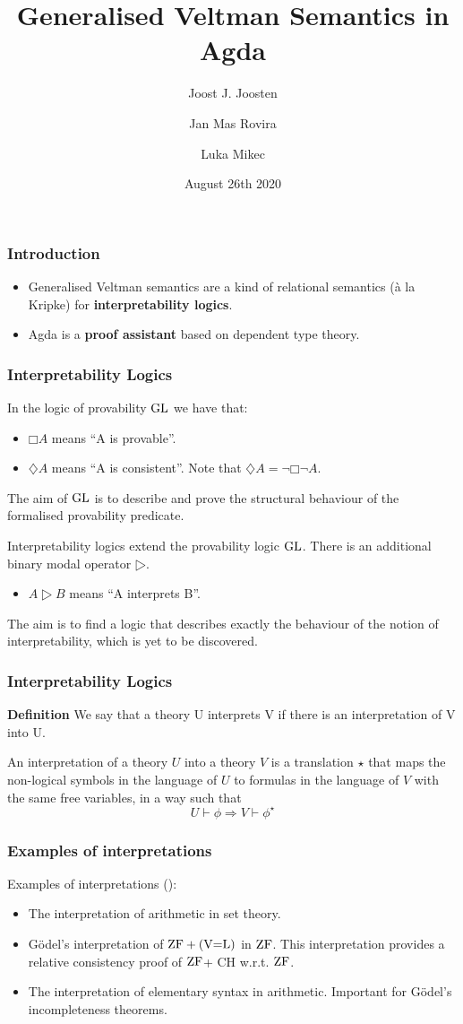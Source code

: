 \documentclass{beamer}
\title{Generalised Veltman Semantics in Agda}
\author{Joost J. Joosten\inst{1} \and Jan Mas Rovira\inst{1}\and Luka Mikec\inst{2}}
\institute[shortinst]{\inst{1} University of Barcelona \and %
  \inst{2} University of Zagreb}
\date{August 26th 2020}
\newcommand{\gl}{\ensuremath{\textup{GL}}\xspace}
\newcommand{\zf}{\ensuremath{\textup{ZF}}\xspace}
\newcommand{\veql}{\ensuremath{\textup{(V=L)}}\xspace}
\begin{document}
\frame{\titlepage}

\begin{frame}
  \frametitle{Introduction}
  \begin{itemize}
  \item Generalised Veltman semantics are a kind of relational semantics (à la
    Kripke) for \textbf{interpretability logics}. \break \pause
    \item Agda is a \textbf{proof assistant} based on dependent type theory.
  \end{itemize}
\end{frame}

\begin{frame}
  \frametitle{Interpretability Logics}
  In the logic of provability \gl we have that:
  \begin{itemize}
    \item $□A$ means ``A is provable''.
    \item $♢A$ means ``A is consistent''. Note that $♢A=¬□¬A$.
  \end{itemize}
  The aim of \gl is to describe and prove the structural behaviour of the
  formalised provability predicate.

  \pause \vspace{0.5cm}

  Interpretability logics extend the provability logic \gl. There is an
  additional binary modal operator $▷$.
  \begin{itemize}
  \item $A▷B$ means ``A interprets B''.
  \end{itemize}
  The aim is to find a logic that describes exactly the behaviour of the notion
  of interpretability, which is yet to be discovered.
\end{frame}

\begin{frame}
  \frametitle{Interpretability Logics}
  \textbf{Definition} We say that a theory U interprets V if there is an
  interpretation of V into U.

  An interpretation of a theory $U$ into a theory $V$ is a translation $⋆$ that
  maps the non-logical symbols in the language of $U$ to formulas in the
  language of $V$ with the same free variables, in a way such that
  \[U⊢ϕ⇒ V⊢ϕ^⋆\]
\end{frame}

\begin{frame}
  \frametitle{Examples of interpretations}
  Examples of interpretations (\cite{visser1997overview}):
  \vspace{0.4cm}
  \begin{itemize}
  \item The interpretation of arithmetic in set theory.
    \pause
  \item Gödel's interpretation of $\zf+\veql$ in \zf. This interpretation
    provides a relative consistency proof of \zf + CH w.r.t. \zf.
    \pause
  \item The interpretation of elementary syntax in arithmetic. Important for
    Gödel's incompleteness theorems.
  \end{itemize}

\end{frame}
\end{document}

